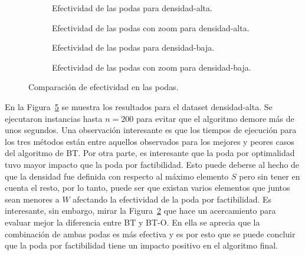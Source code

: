 \documentclass[10pt,a4paper]{article}
\begin{document}
\begin{figure}
    \centering
    \begin{subfigure}{0.45\linewidth}
        \centering
        
        \caption{Efectividad de las podas para densidad-alta.}
        \label{fig:bt-podas-alta}
    \end{subfigure}
    \begin{subfigure}{0.45\linewidth}
        \centering
        
        \caption{Efectividad de las podas con zoom para densidad-alta. }
        \label{fig:bt-podas-alta-zoom}
    \end{subfigure}
    \begin{subfigure}{0.45\linewidth}
        \centering
        
        \caption{Efectividad de las podas para densidad-baja.}
        \label{fig:bt-podas-baja}
    \end{subfigure}
    \begin{subfigure}{0.45\linewidth}
        \centering
        
        \caption{Efectividad de las podas con zoom para densidad-baja. }
        \label{fig:bt-podas-baja-zoom}
    \end{subfigure}
    \caption{Comparación de efectividad en las podas.}
    \label{fig:bt-podas-alta}
\end{figure}

En la Figura~\ref{fig:bt-podas-alta} se muestra los resultados para el dataset densidad-alta. Se ejecutaron instancias hasta $n=200$ para evitar que el algoritmo demore más de unos segundos. Una observación interesante es que los tiempos de ejecución para los tres métodos están entre aquellos observados para los mejores y peores casos del algoritmo de BT. Por otra parte, es interesante que la poda por optimalidad tuvo mayor impacto que la poda por factibilidad. Esto puede deberse al hecho de que la densidad fue definida con respecto al máximo elemento $S$ pero sin tener en cuenta el resto, por lo tanto, puede ser que existan varios elementos que juntos sean menores a $W$ afectando la efectividad de la poda por factibilidad. Es interesante, sin embargo, mirar la Figura~\ref{fig:bt-podas-alta-zoom} que hace un acercamiento para evaluar mejor la diferencia entre BT y BT-O. En ella se aprecia que la combinación de ambas podas es más efectiva y es por esto que se puede concluir que la poda por factibilidad tiene un impacto positivo en el algoritmo final.
\end{document}
